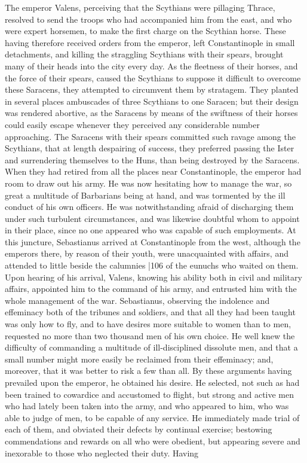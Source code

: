 The emperor Valens, perceiving that the Scythians were pillaging Thrace, resolved to send the troops who had accompanied him from the east, and who were expert horsemen, to make the first charge on the Scythian horse. These having therefore received orders from the emperor, left Constantinople in small detachments, and killing the straggling Scythians with their spears, brought many of their heads into the city every day. As the fleetness of their horses, and the force of their spears, caused the Scythians to suppose it difficult to overcome these Saracens, they attempted to circumvent them by stratagem. They planted in several places ambuscades of three Scythians to one Saracen; but their design was rendered abortive, as the Saracens by means of the swiftness of their horses could easily escape whenever they perceived any considerable number approaching. The Saracens with their spears committed such ravage among the Scythians, that at length despairing of success, they preferred passing the Ister and surrendering themselves to the Huns, than being destroyed by the Saracens. When they had retired from all the places near Constantinople, the emperor had room to draw out his army. He was now hesitating how to manage the war, so great a multitude of Barbarians being at hand, and was tormented by the ill conduct of his own officers. He was notwithstanding afraid of discharging them under such turbulent circumstances, and was likewise doubtful whom to appoint in their place, since no one appeared who was capable of such employments. At this juncture, Sebastianus arrived at Constantinople from the west, although the emperors there, by reason of their youth, were unacquainted with affairs, and attended to little beside the calumnies
|106
of the eunuchs who waited on them. Upon hearing of his arrival, Valens, knowing his ability both in civil and military affairs, appointed him to the command of his army, and entrusted him with the whole management of the war. Sebastianus, observing the indolence and effeminacy both of the tribunes and soldiers, and that all they had been taught was only how to fly, and to have desires more suitable to women than to men, requested no more than two thousand men of his own choice. He well knew the difficulty of commanding a multitude of ill-disciplined dissolute men, and that a small number might more easily be reclaimed from their effeminacy; and, moreover, that it was better to risk a few than all. By these arguments having prevailed upon the emperor, he obtained his desire. He selected, not such as had been trained to cowardice and accustomed to flight, but strong and active men who had lately been taken into the army, and who appeared to him, who was able to judge of men, to be capable of any service. He immediately made trial of each of them, and obviated their defects by continual exercise; bestowing commendations and rewards on all who were obedient, but appearing severe and inexorable to those who neglected their duty. Having
